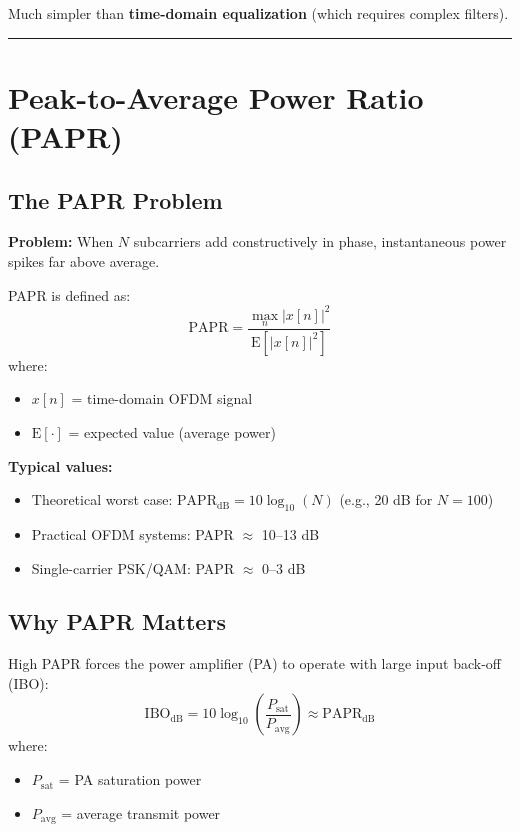 Much simpler than \textbf{time-domain equalization} (which requires
complex filters).

\begin{center}\rule{0.5\linewidth}{0.5pt}\end{center}

\section{Peak-to-Average Power Ratio (PAPR)}

\subsection{The PAPR Problem}

\textbf{Problem:} When $N$ subcarriers add constructively in phase, instantaneous power spikes far above average.

PAPR is defined as:
\begin{equation}
\mathrm{PAPR} = \frac{\max_{n} |x[n]|^2}{\mathrm{E}[|x[n]|^2]}
\end{equation}
where:
\begin{itemize}
\item $x[n]$ = time-domain OFDM signal
\item $\mathrm{E}[\cdot]$ = expected value (average power)
\end{itemize}

\textbf{Typical values:}
\begin{itemize}
\item Theoretical worst case: $\mathrm{PAPR}_{\mathrm{dB}} = 10\log_{10}(N)$ (e.g., 20 dB for $N=100$)
\item Practical OFDM systems: PAPR $\approx$ 10--13 dB
\item Single-carrier PSK/QAM: PAPR $\approx$ 0--3 dB
\end{itemize}

\subsection{Why PAPR Matters}

High PAPR forces the power amplifier (PA) to operate with large input back-off (IBO):
\begin{equation}
\mathrm{IBO}_{\mathrm{dB}} = 10\log_{10}\left(\frac{P_{\mathrm{sat}}}{P_{\mathrm{avg}}}\right) \approx \mathrm{PAPR}_{\mathrm{dB}}
\end{equation}
where:
\begin{itemize}
\item $P_{\mathrm{sat}}$ = PA saturation power
\item $P_{\mathrm{avg}}$ = average transmit power
\end{itemize}

